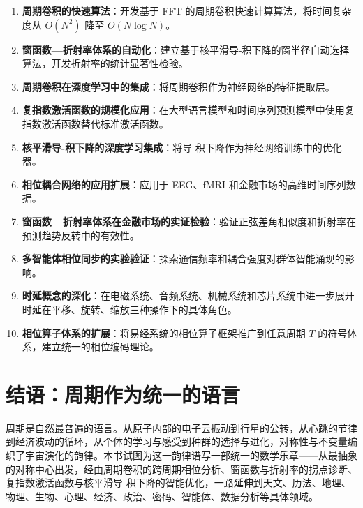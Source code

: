 \begin{enumerate}[leftmargin=*]
\rightskip=0pt plus1fil\relax
\item \textbf{周期卷积的快速算法}：开发基于 FFT 的周期卷积快速计算算法，将时间复杂度从 $O(N^2)$ 降至 $O(N\log N)$。

\item \textbf{窗函数—折射率体系的自动化}：建立基于核平滑导-积下降的窗半径自动选择算法，开发折射率的统计显著性检验。

\item \textbf{周期卷积在深度学习中的集成}：将周期卷积作为神经网络的特征提取层。

\item \textbf{复指数激活函数的规模化应用}：在大型语言模型和时间序列预测模型中使用复指数激活函数替代标准激活函数。

\item \textbf{核平滑导-积下降的深度学习集成}：将导-积下降作为神经网络训练中的优化器。

\item \textbf{相位耦合网络的应用扩展}：应用于 EEG、fMRI 和金融市场的高维时间序列数据。

\item \textbf{窗函数—折射率体系在金融市场的实证检验}：验证正弦差角相似度和折射率在预测趋势反转中的有效性。

\item \textbf{多智能体相位同步的实验验证}：探索通信频率和耦合强度对群体智能涌现的影响。

\item \textbf{时延概念的深化}：在电磁系统、音频系统、机械系统和芯片系统中进一步展开时延在平移、旋转、缩放三种操作下的具体角色。

\item \textbf{相位算子体系的扩展}：将易经系统的相位算子框架推广到任意周期 $T$ 的符号体系，建立统一的相位编码理论。
\end{enumerate}

\section{结语：周期作为统一的语言}

周期是自然最普遍的语言。从原子内部的电子云振动到行星的公转，从心跳的节律到经济波动的循环，从个体的学习与感受到种群的选择与进化，对称性与不变量编织了宇宙演化的韵律。本书试图为这一韵律谱写一部统一的数学乐章——从最抽象的对称中心出发，经由周期卷积的跨周期相位分析、窗函数与折射率的拐点诊断、复指数激活函数与核平滑导-积下降的智能优化，一路延伸到天文、历法、地理、物理、生物、心理、经济、政治、密码、智能体、数据分析等具体领域。

